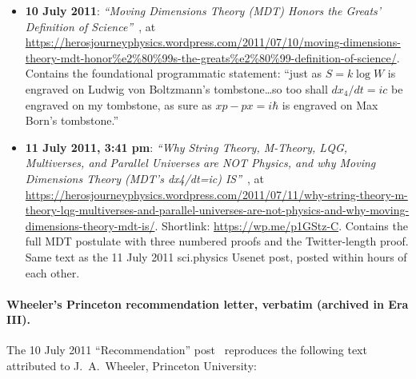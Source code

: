 \documentclass[11pt,a4paper]{article}
\begin{document}
\begin{itemize}
\item \textbf{10 July 2011}: \emph{``Moving Dimensions Theory (MDT) Honors the Greats' Definition of Science''}~\cite{mcguckenherosjourney2011a}, at \url{https://herosjourneyphysics.wordpress.com/2011/07/10/moving-dimensions-theory-mdt-honor\%e2\%80\%99s-the-greats\%e2\%80\%99-definition-of-science/}. Contains the foundational programmatic statement: ``just as $S = k \log W$ is engraved on Ludwig von Boltzmann's tombstone\ldots so too shall $dx_4/dt = ic$ be engraved on my tombstone, as sure as $xp - px = i\hbar$ is engraved on Max Born's tombstone.''

\item \textbf{11 July 2011, 3:41 pm}: \emph{``Why String Theory, M-Theory, LQG, Multiverses, and Parallel Universes are NOT Physics, and why Moving Dimensions Theory (MDT's dx4/dt=ic) IS''}~\cite{mcguckenherosjourney2011b}, at \url{https://herosjourneyphysics.wordpress.com/2011/07/11/why-string-theory-m-theory-lqg-multiverses-and-parallel-universes-are-not-physics-and-why-moving-dimensions-theory-mdt-is/}. Shortlink: \url{https://wp.me/p1GStz-C}. Contains the full MDT postulate with three numbered proofs and the Twitter-length proof. Same text as the 11 July 2011 sci.physics Usenet post, posted within hours of each other.
\end{itemize}

\paragraph{Wheeler's Princeton recommendation letter, verbatim (archived in Era III).} The 10 July 2011 ``Recommendation'' post~\cite{mcguckenherosjourney2011f} reproduces the following text attributed to J.\ A.\ Wheeler, Princeton University:
\end{document}
